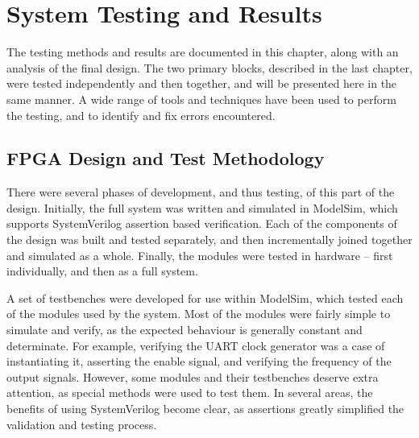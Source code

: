 \chapter{System Testing and Results} %
\label{cha:system_testing}


The testing methods and results are documented in this chapter, along with an analysis of the final design.  The two primary blocks, described in the last chapter, were tested independently and then together, and will be presented here in the same manner.  A wide range of tools and techniques have been used to perform the testing, and to identify and fix errors encountered.


\section{FPGA Design and Test Methodology} %
\label{sec:fpga_design_and_test_methodology}
	There were several phases of development, and thus testing, of this part of the design.  Initially, the full system was written and simulated in ModelSim, which supports SystemVerilog assertion based verification.  Each of the components of the design was built and tested separately, and then incrementally joined together and simulated as a whole.  Finally, the modules were tested in hardware -- first individually, and then as a full system.

	A set of testbenches were developed for use within ModelSim, which tested each of the modules used by the system.  Most of the modules were fairly simple to simulate and verify, as the expected behaviour is generally constant and determinate.  For example, verifying the UART clock generator was a case of instantiating it, asserting the enable signal, and verifying the frequency of the output signals.  However, some modules and their testbenches deserve extra attention, as special methods were used to test them.  In several areas, the benefits of using SystemVerilog become clear, as assertions greatly simplified the validation and testing process.



